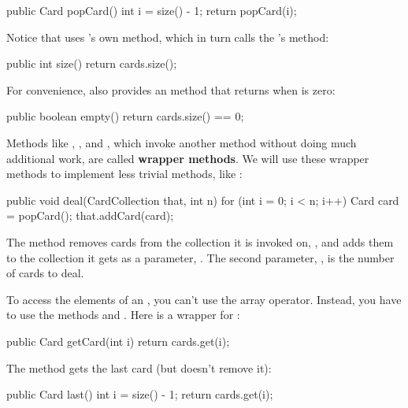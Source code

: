 \begin{code}
public Card popCard() {
    int i = size() - 1;
    return popCard(i);
}
\end{code}

Notice that  uses 's own  method, which in turn calls the 's  method:

\begin{code}
public int size() {
    return cards.size();
}
\end{code}

For convenience,  also provides an  method that returns  when  is zero:

\begin{code}
public boolean empty() {
    return cards.size() == 0;
}
\end{code}


Methods like , , and , which invoke another method without doing much additional work, are called {\bf wrapper methods}.
We will use these wrapper methods to implement less trivial methods, like :

\begin{code}
public void deal(CardCollection that, int n) {
    for (int i = 0; i < n; i++) {
        Card card = popCard();
        that.addCard(card);
    }
}
\end{code}

The  method removes cards from the collection it is invoked on, , and adds them to the collection it gets as a parameter, .
The second parameter, , is the number of cards to deal.

To access the elements of an , you can't use the array \java{[]} operator.
Instead, you have to use the methods  and .
Here is a wrapper for :

\begin{code}
public Card getCard(int i) {
    return cards.get(i);
}
\end{code}

The  method gets the last card (but doesn't remove it):

\begin{code}
public Card last() {
    int i = size() - 1;
    return cards.get(i);
}
\end{code}

